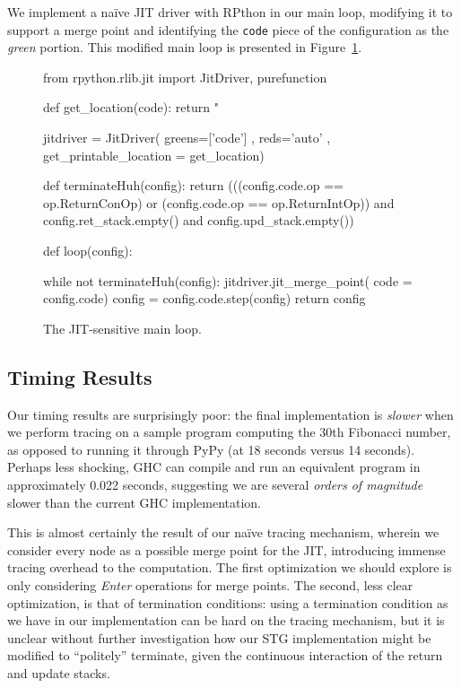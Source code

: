 \documentclass[preprint]{sigplanconf}
\begin{document}
We implement a na\"{i}ve JIT driver with RPthon in our main loop, modifying it
to support a merge point and identifying the \lstinline{code} piece of the 
configuration as the \emph{green} portion. This modified main loop is presented
in Figure~\ref{fig:jitloop}.
\begin{figure}
\begin{code}
from rpython.rlib.jit 
  import JitDriver, purefunction

def get_location(code):
    return "%

jitdriver = 
  JitDriver( greens=['code']
           , reds='auto'
           , get_printable_location =
               get_location)

def terminateHuh(config):
  return (((config.code.op == op.ReturnConOp) or 
           (config.code.op == op.ReturnIntOp)) 
          and config.ret_stack.empty()
          and config.upd_stack.empty())

def loop(config):

  while not terminateHuh(config):
    jitdriver.jit_merge_point( code = 
                                 config.code)
    config = config.code.step(config)
  return config
\end{code}
\caption{\label{fig:jitloop}The JIT-sensitive main loop.}
\end{figure}

\subsection{Timing Results}

Our timing results are surprisingly poor: 
the final implementation is \emph{slower} when we perform tracing on
a sample program computing the 30th Fibonacci number, as opposed to running
it through PyPy (at 18 seconds versus 14 seconds). Perhaps less shocking,
GHC can compile and run an equivalent program in approximately 0.022 seconds,
suggesting we are several \emph{orders of magnitude} slower than the current
GHC implementation.

This is almost certainly the result of our na\"{i}ve tracing mechanism, wherein
we consider every node as a possible merge point for the JIT, introducing
immense tracing overhead to the computation. The first optimization we should
explore is only considering \textit{Enter} operations for merge points. The
second, less clear optimization, is that of termination conditions: using a
termination condition as we have in our implementation can be hard on the
tracing mechanism, but it is unclear without further investigation how our STG
implementation might be modified to ``politely'' terminate, given the continuous
interaction of the return and update stacks.
\end{document}
